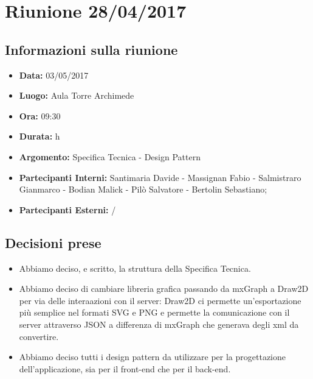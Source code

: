 \section{Riunione 28/04/2017}
  \subsection{Informazioni sulla riunione}
    \begin{itemize}
      \item \textbf{Data: }03/05/2017
      \item \textbf{Luogo: }Aula Torre Archimede
      \item \textbf{Ora: }09:30
      \item \textbf{Durata: }h
      \item \textbf{Argomento: }Specifica Tecnica - Design Pattern
      \item \textbf{Partecipanti Interni: }Santimaria Davide - Massignan Fabio - Salmistraro Gianmarco - Bodian Malick - Pilò Salvatore - Bertolin Sebastiano;
      \item \textbf{Partecipanti Esterni: }/
    \end{itemize}
  \subsection{Decisioni prese}
		\begin{itemize}
			\item Abbiamo deciso, e scritto, la struttura della Specifica Tecnica.
      \item Abbiamo deciso di cambiare libreria grafica passando da mxGraph a Draw2D per via delle interaazioni con il server: Draw2D ci permette un'esportazione più semplice
      nel formati SVG e PNG e permette la comunicazione con il server attraverso JSON a differenza di mxGraph che generava degli xml da convertire.
      \item Abbiamo deciso tutti i design pattern da utilizzare per la progettazione dell'applicazione, sia per il front-end che per il back-end.
		\end{itemize}
